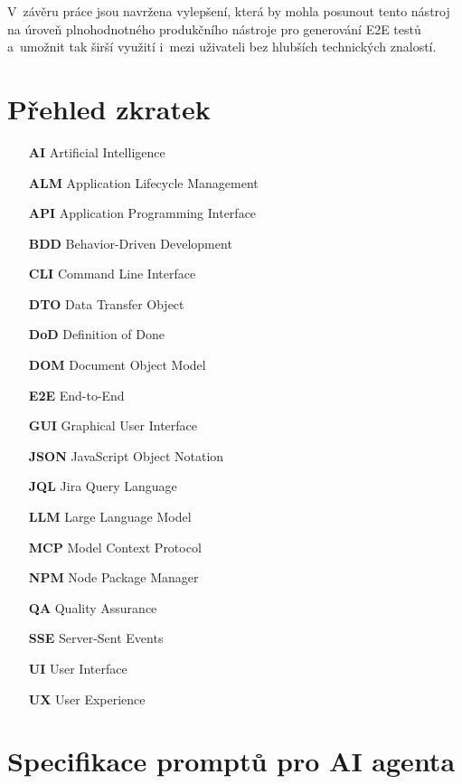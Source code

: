 \documentclass[czech, ing, kiv, he, iso690numb, viewonly]{fasthesis}
\begin{document}
V~závěru práce jsou navržena vylepšení, která by mohla posunout tento nástroj na úroveň plnohodnotného produkčního nástroje pro generování E2E testů
a~umožnit tak širší využití i~mezi uživateli bez hlubších technických znalostí.




\chapter*{Přehled zkratek}

\begin{itemize}[align=left, labelwidth=1.5cm, labelsep=10pt, leftmargin=!]
    \item[\textbf{AI}]    Artificial Intelligence 
    \item[\textbf{ALM}]    Application Lifecycle Management 
    \item[\textbf{API}]    Application Programming Interface 
    \item[\textbf{BDD}]    Behavior-Driven Development 
    \item[\textbf{CLI}]    Command Line Interface 
    \item[\textbf{DTO}]    Data Transfer Object 
    \item[\textbf{DoD}]    Definition of Done 
    \item[\textbf{DOM}]    Document Object Model 
    \item[\textbf{E2E}]    End-to-End 
    \item[\textbf{GUI}]    Graphical User Interface 
    \item[\textbf{JSON}]    JavaScript Object Notation
    \item[\textbf{JQL}]    Jira Query Language
    \item[\textbf{LLM}]    Large Language Model 
    \item[\textbf{MCP}]    Model Context Protocol 
    \item[\textbf{NPM}]    Node Package Manager
    \item[\textbf{QA}]    Quality Assurance 
    \item[\textbf{SSE}]    Server-Sent Events 
    \item[\textbf{UI}]    User Interface 
    \item[\textbf{UX}]    User Experience 
\end{itemize}

\appendix
\chapter{Specifikace promptů pro AI agenta}\label{app:prompts}
\end{document}
